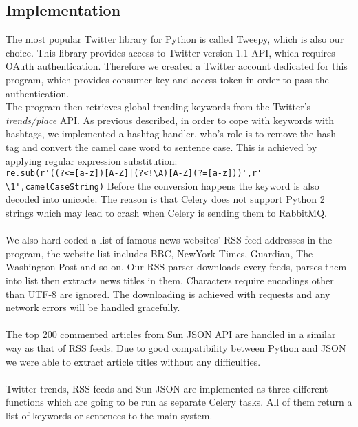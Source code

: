 \subsection{Implementation}
The most popular Twitter library for Python is called Tweepy, which is also 
our choice. This library provides access to Twitter version 1.1 API, which 
requires OAuth authentication. Therefore we created a Twitter account 
dedicated for this program, which provides consumer key and access token in 
order to pass the authentication. \\
The program then retrieves global trending keywords from the Twitter's {\em 
trends/place} API. As previous described, in order to cope with keywords with 
hashtags, we implemented a hashtag handler, who's role is to remove the hash 
tag and convert the camel case word to sentence case. This is achieved by 
applying regular expression substitution: \\
\newline
\verb`re.sub(r'((?<=[a-z])[A-Z]|(?<!\A)[A-Z](?=[a-z]))',r' \1',camelCaseString)`
\newline
Before the conversion happens the keyword is also decoded into unicode. The 
reason is that Celery does not support Python 2 strings which may lead to 
crash when Celery is sending them to RabbitMQ. 
\paragraph{}
We also hard coded a list of famous news websites' RSS feed addresses in the 
program, the website list includes BBC, NewYork Times, Guardian, The Washington 
Post and so on. Our RSS parser downloads every feeds, parses them into list 
then extracts news titles in them. Characters require encodings other than 
UTF-8 are ignored. The downloading is achieved with requests and any network 
errors will be handled gracefully. 
\paragraph{}
The top 200 commented articles from Sun JSON API are handled in a similar way 
as that of RSS feeds. Due to good compatibility between Python and JSON we 
were able to extract article titles without any difficulties. 
\paragraph{}
Twitter trends, RSS feeds and Sun JSON are implemented as three different 
functions which are going to be run as separate Celery tasks. All of them 
return a list of keywords or sentences to the main system. 
